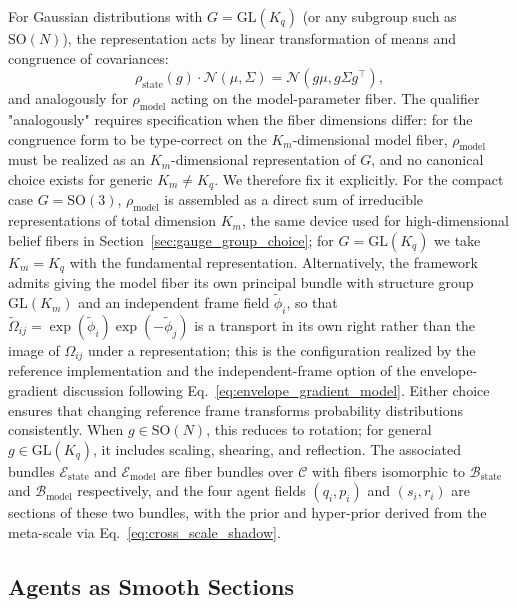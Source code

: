 \documentclass[11pt]{article}
\begin{document}
For Gaussian distributions with $G = \mathrm{GL}(K_q)$ (or any subgroup such as $\mathrm{SO}(N)$), the representation acts by linear transformation of means and congruence of covariances:
\begin{equation}
\rho_{\mathrm{state}}(g) \cdot \mathcal{N}(\mu, \Sigma) = \mathcal{N}(g\mu, g\Sigma g^\top),
\end{equation}
and analogously for $\rho_{\mathrm{model}}$ acting on the model-parameter fiber. The qualifier "analogously" requires specification when the fiber dimensions differ: for the congruence form to be type-correct on the $K_m$-dimensional model fiber, $\rho_{\mathrm{model}}$ must be realized as an $K_m$-dimensional representation of $G$, and no canonical choice exists for generic $K_m \neq K_q$. We therefore fix it explicitly. For the compact case $G = \mathrm{SO}(3)$, $\rho_{\mathrm{model}}$ is assembled as a direct sum of irreducible representations of total dimension $K_m$, the same device used for high-dimensional belief fibers in Section~\ref{sec:gauge_group_choice}; for $G = \mathrm{GL}(K_q)$ we take $K_m = K_q$ with the fundamental representation. Alternatively, the framework admits giving the model fiber its own principal bundle with structure group $\mathrm{GL}(K_m)$ and an independent frame field $\tilde{\phi}_i$, so that $\tilde{\Omega}_{ij} = \exp(\tilde{\phi}_i)\exp(-\tilde{\phi}_j)$ is a transport in its own right rather than the image of $\Omega_{ij}$ under a representation; this is the configuration realized by the reference implementation and the independent-frame option of the envelope-gradient discussion following Eq.~\eqref{eq:envelope_gradient_model}. Either choice ensures that changing reference frame transforms probability distributions consistently. When $g \in \mathrm{SO}(N)$, this reduces to rotation; for general $g \in \mathrm{GL}(K_q)$, it includes scaling, shearing, and reflection. The associated bundles $\mathcal{E}_{\mathrm{state}}$ and $\mathcal{E}_{\mathrm{model}}$ are fiber bundles over $\mathcal{C}$ with fibers isomorphic to $\mathcal{B}_{\mathrm{state}}$ and $\mathcal{B}_{\mathrm{model}}$ respectively, and the four agent fields $(q_i, p_i)$ and $(s_i, r_i)$ are sections of these two bundles, with the prior and hyper-prior derived from the meta-scale via Eq.~\eqref{eq:cross_scale_shadow}.

\subsection{Agents as Smooth Sections}
\label{sec:agent_definition}
\end{document}
